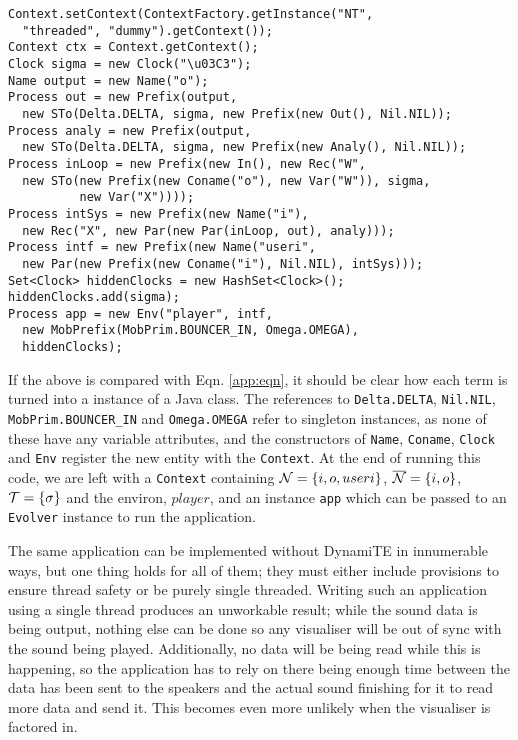 \begin{verbatim}
Context.setContext(ContextFactory.getInstance("NT",
  "threaded", "dummy").getContext());
Context ctx = Context.getContext();
Clock sigma = new Clock("\u03C3");
Name output = new Name("o");
Process out = new Prefix(output,
  new STo(Delta.DELTA, sigma, new Prefix(new Out(), Nil.NIL));
Process analy = new Prefix(output,
  new STo(Delta.DELTA, sigma, new Prefix(new Analy(), Nil.NIL));
Process inLoop = new Prefix(new In(), new Rec("W",
  new STo(new Prefix(new Coname("o"), new Var("W")), sigma,
          new Var("X"))));
Process intSys = new Prefix(new Name("i"),
  new Rec("X", new Par(new Par(inLoop, out), analy)));
Process intf = new Prefix(new Name("useri",
  new Par(new Prefix(new Coname("i"), Nil.NIL), intSys)));
Set<Clock> hiddenClocks = new HashSet<Clock>();
hiddenClocks.add(sigma);
Process app = new Env("player", intf,
  new MobPrefix(MobPrim.BOUNCER_IN, Omega.OMEGA),
  hiddenClocks);
\end{verbatim}

If the above is compared with Eqn. \ref{app:eqn}, it should be clear
how each term is turned into a instance of a Java class.  The
references to \texttt{Delta.DELTA}, \texttt{Nil.NIL},
\texttt{MobPrim.BOUNCER\_IN} and \texttt{Omega.OMEGA} refer to
singleton instances, as none of these have any variable attributes,
and the constructors of \texttt{Name}, \texttt{Coname}, \texttt{Clock}
and \texttt{Env} register the new entity with the \texttt{Context}.
At the end of running this code, we are left with a \texttt{Context}
containing $\text{$\mathcal{N}$} = \{i,o,useri\}$, $\text{$\overline{\text{$\mathcal{N}$}}$} = \{i,o\}$, $\text{$\mathcal{T}$} =
\{\sigma\}$ and the environ, $player$, and an instance \texttt{app}
which can be passed to an \texttt{Evolver} instance to run the
application.

The same application can be implemented without DynamiTE in
innumerable ways, but one thing holds for all of them; they must
either include provisions to ensure thread safety or be purely single
threaded.  Writing such an application using a single thread produces
an unworkable result; while the sound data is being output, nothing
else can be done so any visualiser will be out of sync with the sound
being played.  Additionally, no data will be being read while this is
happening, so the application has to rely on there being enough time
between the data has been sent to the speakers and the actual sound
finishing for it to read more data and send it.  This becomes even
more unlikely when the visualiser is factored in.

